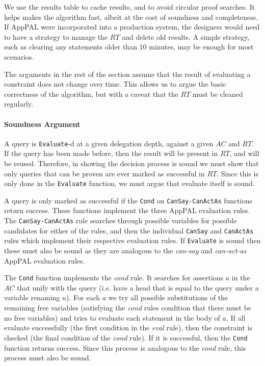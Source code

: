 \documentclass[thesis.tex]{subfiles}
\begin{document}
We use the results table to cache results, and to avoid circular proof searches.
It helps makes the algorithm fast, albeit at the cost of soundness and
completeness. If AppPAL were incorporated into a production system, the
designers would need to have a strategy to manage the $RT$ and delete old
results. A simple strategy, such as clearing any statements older than 10
minutes, may be enough for most scenarios.

The arguments in the rest of the section assume that the result of evaluating a
constraint does not change over time. This allows us to argue the basic
correctness of the algorithm, but with a caveat that the $RT$ must be cleaned
regularly.

\paragraph*{Soundness Argument}
A query is \texttt{Evaluate}-d at a given delegation depth, against a given
$AC$ and $RT$. If the query has been made before,
then the result will be present in $RT$, and will be reused. Therefore, in
showing the decision process is sound we must show that only queries that can be
proven are ever marked as successful in $RT$. Since this is only done in the
\texttt{Evaluate} function, we must argue that evaluate itself is sound.

A query is only marked as successful if the \texttt{Cond} on
\texttt{CanSay-CanActAs} functions return success. These functions implement the
three AppPAL evaluation rules. The \texttt{CanSay-CanActAs} rule searches
through possible variables for possible candidates for either of the rules, and
then the individual \texttt{CanSay} and \texttt{CanActAs} rules which implement
their respective evaluation rules. If \texttt{Evaluate} is sound then these must
also be sound as they are analogous to the \emph{can-say} and \emph{can-act-as}
AppPAL evaluation rules.

The \texttt{Cond} function implements the \emph{cond} rule. It searches for
assertions $a$ in the $AC$ that unify with the query (i.e. have a head that is
equal to the query under a variable renaming $u$). For each $a$ we try all
possible substitutions of the remaining free variables (satisfying the
\emph{cond} rules condition that there must be no free variables) and tries to
evaluate each statement in the body of $a$. If all evaluate successfully (the
first condition in the \emph{eval} rule), then the constraint is checked (the
final condition of the \emph{cond} rule). If it is successful, then the
\texttt{Cond} function returns success. Since this process is analogous to the
\emph{cond} rule, this process must also be sound.
\end{document}
